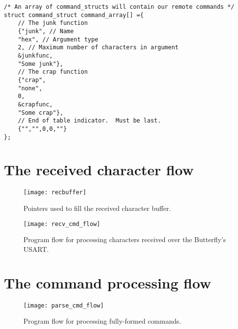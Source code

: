 \lstset{language=C}
\begin{lstlisting}[float, % Allows this listing to be a latex float
                   frame=single,
                   caption={Defining the command set with an array of
                            command structures.},
                   label=lst:cmdarray
                  ]
/* An array of command_structs will contain our remote commands */
struct command_struct command_array[] ={
    // The junk function
    {"junk", // Name
    "hex", // Argument type
    2, // Maximum number of characters in argument
    &junkfunc,
    "Some junk"},
    // The crap function
    {"crap",
    "none",
    0,
    &crapfunc,
    "Some crap"},
    // End of table indicator.  Must be last.
    {"","",0,0,""}
};
\end{lstlisting}

\clearpage{}
\section{The received character flow}

\begin{figure}[ht]
    \begin{center}
        \texttt{[image: recbuffer]}
        \caption{Pointers used to fill the received character buffer.\label{fig:recbuffer}}
    \end{center}
\end{figure}


\begin{figure}[ht]
    \begin{center}
        \texttt{[image: recv\_cmd\_flow]}
        \caption{Program flow for processing characters received over the Butterfly's USART.\label{fig:recflow}}
    \end{center}
\end{figure}



\clearpage{}
\section{The command processing flow}

\begin{figure}[ht]
    \begin{center}
        \texttt{[image: parse\_cmd\_flow]}
        \caption{Program flow for processing fully-formed commands.\label{fig:cmdflow}}
    \end{center}
\end{figure}






